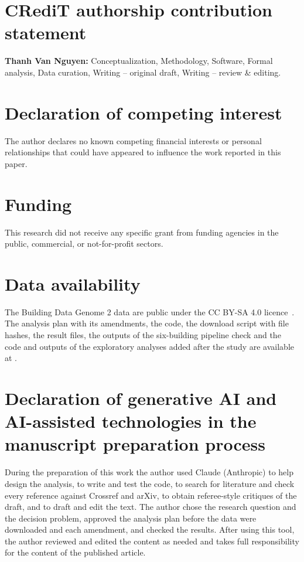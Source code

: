 \ifdefined\ANON\else
\section*{CRediT authorship contribution statement}
\textbf{Thanh Van Nguyen:} Conceptualization, Methodology, Software, Formal analysis, Data curation, Writing -- original draft, Writing -- review \& editing.
\fi

\section*{Declaration of competing interest}
The author declares no known competing financial interests or personal relationships that could have appeared to influence the work reported in this paper.

\section*{Funding}
This research did not receive any specific grant from funding agencies in the public, commercial, or not-for-profit sectors.

\section*{Data availability}
The Building Data Genome 2 data are public under the CC BY-SA 4.0 licence~\cite{miller2020bdg2}. The analysis plan with its amendments, the code, the download script with file hashes, the result files, the outputs of the six-building pipeline check and the code and outputs of the exploratory analyses added after the study are available at \repolink.

\section*{Declaration of generative AI and AI-assisted technologies in the manuscript preparation process}
During the preparation of this work the author used Claude (Anthropic) to help design the analysis, to write and test the code, to search for literature and check every reference against Crossref and arXiv, to obtain referee-style critiques of the draft, and to draft and edit the text. The author chose the research question and the decision problem, approved the analysis plan before the data were downloaded and each amendment, and checked the results. After using this tool, the author reviewed and edited the content as needed and takes full responsibility for the content of the published article.
